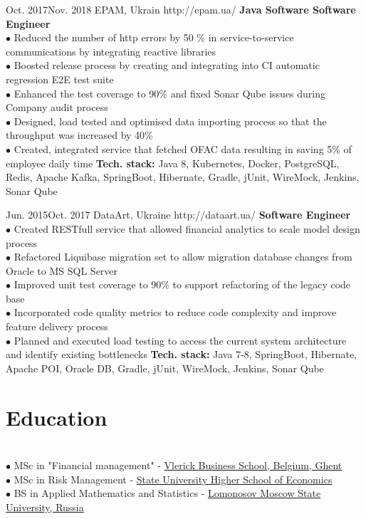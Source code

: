 \documentclass[10pt]{article} %
\begin{document}
\job
{Oct. 2017}{Nov. 2018}
{EPAM, Ukrain}
{http://epam.ua/}
{\textbf{Java Software Software Engineer}}
{
\textbf{}    
\\$\bullet$ Reduced the number of http errors by 50 \% in service-to-service communications by integrating reactive libraries 
\\$\bullet$ Boosted release process by creating and integrating into CI automatic regression E2E test suite
\\$\bullet$ Enhanced the test coverage to 90\% and fixed Sonar Qube issues during Company audit process
\\$\bullet$ Designed, load tested and optimised data importing process so that the throughput was increased by 40\%
\\$\bullet$ Created, integrated service that fetched OFAC data resulting in saving 5\% of employee daily time 
\vadjust{\vspace{4pt}}
\newline
\textbf{Tech. stack: }{Java 8, Kubernetes, Docker, PostgreSQL, Redis, Apache Kafka, SpringBoot, Hibernate, Gradle, jUnit, WireMock, Jenkins, Sonar Qube}  
 }

\job
{Jun. 2015}{Oct. 2017}
{DataArt, Ukraine}
{http://dataart.ua/}
{\textbf{Software Engineer}}
{
\textbf{}  
\\$\bullet$ Created RESTfull service that allowed financial analytics to scale model design process 
\\$\bullet$ Refactored Liquibase migration set to allow migration database changes from Oracle to MS SQL Server
\\$\bullet$ Improved unit test coverage to 90\% to support refactoring of the legacy code base
\\$\bullet$ Incorporated code quality metrics to reduce code complexity and improve feature delivery process
\\$\bullet$ Planned and executed load testing to access the current system architecture and identify existing bottlenecks
\vadjust{\vspace{4pt}}
\newline
\textbf{Tech. stack: }{Java 7-8, SpringBoot, Hibernate, Apache POI, Oracle DB, Gradle, jUnit, WireMock, Jenkins, Sonar Qube}  
 }
 
 \section{Education}
 {
 \textbf{}  
 \\$\bullet$ MSc in "Financial management"  - \href{https://www.vlerick.com/en}{Vlerick Business School, Belgium, Ghent}
\\$\bullet$  MSc in Risk Management  - \href{https://www.hse.ru}{State University  Higher School of Economics}
\\$\bullet$  BS in Applied Mathematics and Statistics - \href{http://www.msu.ru/en/}{Lomonosov Moscow State University, Russia}
 }
\end{document}
